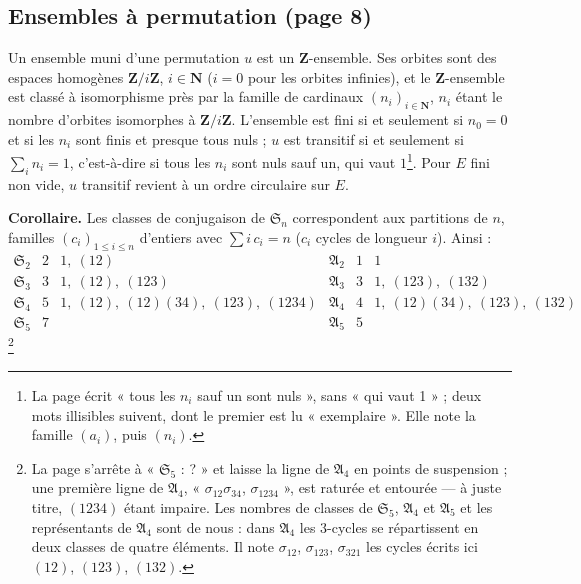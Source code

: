 \documentclass[11pt,a4paper]{article}
\begin{document}
\subsection*{Ensembles à permutation (page 8)}

Un ensemble muni d'une permutation $u$ est un $\mathbf{Z}$-ensemble. Ses
orbites sont des espaces homogènes $\mathbf{Z}/i\mathbf{Z}$, $i \in
\mathbf{N}$ ($i = 0$ pour les orbites infinies), et le $\mathbf{Z}$-ensemble
est classé à isomorphisme près par la famille de cardinaux $(n_i)_{i \in
\mathbf{N}}$, $n_i$ étant le nombre d'orbites isomorphes à
$\mathbf{Z}/i\mathbf{Z}$. L'ensemble est fini si et seulement si $n_0 = 0$ et
si les $n_i$ sont finis et presque tous nuls ; $u$ est transitif si et
seulement si $\sum_i n_i = 1$, c'est-à-dire si tous les $n_i$ sont nuls sauf
un, qui vaut $1$\footnote{La page écrit « tous les $n_i$ sauf un sont nuls »,
sans « qui vaut 1 » ; deux mots illisibles suivent, dont le premier est lu
« exemplaire ». Elle note la famille $(a_i)$, puis $(n_i)$.}. Pour $E$ fini
non vide, $u$ transitif revient à un ordre circulaire sur $E$.

\textbf{Corollaire.} Les classes de conjugaison de $\mathfrak{S}_n$
correspondent aux partitions de $n$, familles $(c_i)_{1 \leq i \leq n}$
d'entiers avec $\sum i\,c_i = n$ ($c_i$ cycles de longueur $i$). Ainsi :
\[
  \begin{array}{lll|lll}
    \mathfrak{S}_2 & 2 & 1,\ (12) &
      \mathfrak{A}_2 & 1 & 1 \\
    \mathfrak{S}_3 & 3 & 1,\ (12),\ (123) &
      \mathfrak{A}_3 & 3 & 1,\ (123),\ (132) \\
    \mathfrak{S}_4 & 5 & 1,\ (12),\ (12)(34),\ (123),\ (1234) &
      \mathfrak{A}_4 & 4 & 1,\ (12)(34),\ (123),\ (132) \\
    \mathfrak{S}_5 & 7 & &
      \mathfrak{A}_5 & 5 &
  \end{array}
\]
\footnote{La page s'arrête à « $\mathfrak{S}_5$ : ? » et laisse la ligne de
$\mathfrak{A}_4$ en points de suspension ; une première ligne de
$\mathfrak{A}_4$, « $\sigma_{12}\sigma_{34}$, $\sigma_{1234}$ », est raturée
et entourée --- à juste titre, $(1234)$ étant impaire. Les nombres de classes
de $\mathfrak{S}_5$, $\mathfrak{A}_4$ et $\mathfrak{A}_5$ et les représentants
de $\mathfrak{A}_4$ sont de nous : dans $\mathfrak{A}_4$ les $3$-cycles se
répartissent en deux classes de quatre éléments. Il note $\sigma_{12}$,
$\sigma_{123}$, $\sigma_{321}$ les cycles écrits ici $(12)$, $(123)$,
$(132)$.}
\end{document}
